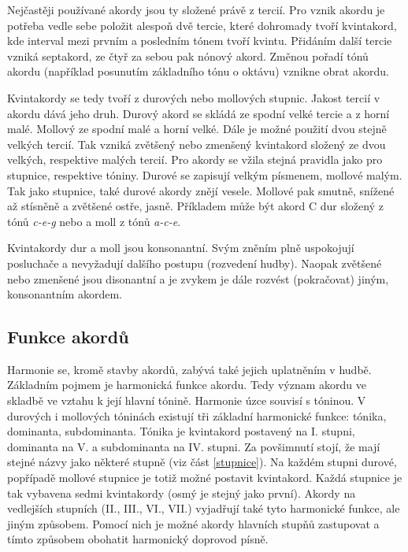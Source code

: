 Nejčastěji používané akordy jsou ty složené právě z tercií.
Pro vznik akordu je potřeba vedle sebe položit alespoň dvě tercie,
které dohromady tvoří kvintakord, 
kde interval mezi prvním a posledním tónem tvoří kvintu.
Přidáním další tercie vzniká septakord, ze čtyř za sebou pak nónový akord.
Změnou pořadí tónů akordu (například posunutím základního tónu o oktávu) 
vznikne obrat akordu.
\cite{zenkl}
\par

Kvintakordy se tedy tvoří z durových nebo mollových stupnic.
Jakost tercií v akordu dává jeho druh.
Durový akord se skládá ze spodní velké tercie a z horní malé.
Mollový ze spodní malé a horní velké.
Dále je možné použití dvou stejně velkých tercií.
Tak vzniká zvětšený nebo zmenšený kvintakord 
složený ze dvou velkých, respektive malých tercií.
\cite{kofron}
Pro akordy se vžila stejná pravidla jako pro stupnice, respektive tóniny.
Durové se zapisují velkým písmenem, mollové malým.
Tak jako stupnice, také durové akordy znějí vesele.
Mollové pak smutně, snížené až stísněně a zvětšené ostře, jasně.
\cite{cmiral}
Příkladem může být akord C dur složený z tónů \emph{c-e-g} 
nebo a moll z tónů \emph{a-c-e}.
\par

Kvintakordy dur a moll jsou konsonantní.
Svým zněním plně uspokojují posluchače a nevyžadují dalšího postupu (rozvedení hudby).
Naopak zvětšené nebo zmenšené jsou disonantní 
a je zvykem je dále rozvést (pokračovat) jiným, konsonantním akordem.
\cite{cmiral}

\subsection{Funkce akordů}
Harmonie se, kromě stavby akordů, zabývá také jejich uplatněním v hudbě.
Základním pojmem je harmonická funkce akordu.
Tedy význam akordu ve skladbě ve vztahu k její hlavní tónině.
Harmonie úzce souvisí s tóninou.
V durových i mollových tóninách existují tři základní harmonické funkce: 
tónika, dominanta, subdominanta.
Tónika je kvintakord postavený na I. stupni, dominanta na V. a subdominanta na IV. stupni.
Za povšimnutí stojí, že mají stejné názvy jako některé stupně  
(viz část \ref{stupnice}).
Na každém stupni durové, popřípadě mollové stupnice je totiž možné postavit kvintakord.
Každá stupnice je tak vybavena sedmi kvintakordy 
(osmý je stejný jako první).
Akordy na vedlejších stupních (II., III., VI., VII.)
vyjadřují také tyto harmonické funkce, ale jiným způsobem.
Pomocí nich je možné akordy hlavních stupňů zastupovat
a tímto způsobem obohatit harmonický doprovod písně.
\cite{kofron,zenkl}
\par

